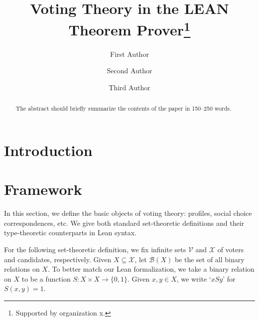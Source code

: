 \documentclass[runningheads]{llncs}
\begin{document}
%
\title{Voting Theory in the LEAN Theorem Prover\thanks{Supported by organization x.}}
%
%
\author{First Author \and
Second Author \and
Third Author}
%
%
%
\maketitle              %
%
\begin{abstract}
The abstract should briefly summarize the contents of the paper in
150--250 words.

\end{abstract}
%
%
%

\section{Introduction}

\section{Framework}

In this section, we define the basic objects of voting theory: profiles, social choice correspondences, etc. We give both standard set-theoretic definitions and their type-theoretic counterparts in Lean syntax.

For the following set-theoretic definition, we fix infinite sets $\mathcal{V}$ and $\mathcal{X}$ of voters and candidates, respectively. Given $X\subseteq\mathcal{X}$, let $\mathcal{B}(X)$ be the set of all binary relations on $X$. To better match our Lean formalization, we take a binary relation on $X$ to be a function $S: X\times X \to \{0,1\}$. Given $x,y\in X$, we write `$xSy$' for $S(x,y)=1$.
\end{document}

